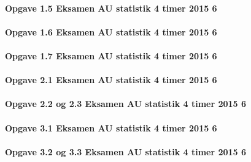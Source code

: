 \documentclass[]{book}
\let\oldparagraph\paragraph
\renewcommand{\paragraph}[1]{\oldparagraph{#1}\mbox{}}
\begin{document}
\hypertarget{opgave-1.5-eksamen-au-statistik-4-timer-2015-6}{%
\paragraph{Opgave 1.5 Eksamen AU statistik 4 timer 2015
6}\label{opgave-1.5-eksamen-au-statistik-4-timer-2015-6}}

\hypertarget{opgave-1.6-eksamen-au-statistik-4-timer-2015-6}{%
\paragraph{Opgave 1.6 Eksamen AU statistik 4 timer 2015
6}\label{opgave-1.6-eksamen-au-statistik-4-timer-2015-6}}

\hypertarget{opgave-1.7-eksamen-au-statistik-4-timer-2015-6}{%
\paragraph{Opgave 1.7 Eksamen AU statistik 4 timer 2015
6}\label{opgave-1.7-eksamen-au-statistik-4-timer-2015-6}}

\hypertarget{opgave-2.1-eksamen-au-statistik-4-timer-2015-6}{%
\paragraph{Opgave 2.1 Eksamen AU statistik 4 timer 2015
6}\label{opgave-2.1-eksamen-au-statistik-4-timer-2015-6}}

\hypertarget{opgave-2.2-og-2.3-eksamen-au-statistik-4-timer-2015-6}{%
\paragraph{Opgave 2.2 og 2.3 Eksamen AU statistik 4 timer 2015
6}\label{opgave-2.2-og-2.3-eksamen-au-statistik-4-timer-2015-6}}

\hypertarget{opgave-3.1-eksamen-au-statistik-4-timer-2015-6}{%
\paragraph{Opgave 3.1 Eksamen AU statistik 4 timer 2015
6}\label{opgave-3.1-eksamen-au-statistik-4-timer-2015-6}}

\hypertarget{opgave-3.2-og-3.3-eksamen-au-statistik-4-timer-2015-6}{%
\paragraph{Opgave 3.2 og 3.3 Eksamen AU statistik 4 timer 2015
6}\label{opgave-3.2-og-3.3-eksamen-au-statistik-4-timer-2015-6}}
\end{document}
